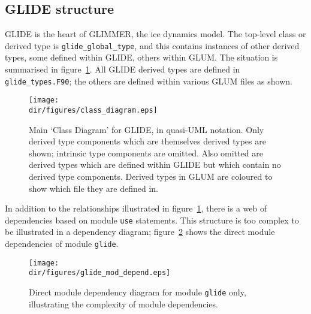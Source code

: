 \subsection{GLIDE structure}
%
GLIDE is the heart of GLIMMER, the ice dynamics model. The top-level class or
derived type is \texttt{glide\_global\_type}, and this contains instances of
other derived types, some defined within GLIDE, others within GLUM. The
situation is summarised in figure~\ref{dg.fig.glide_class_diagram}. All GLIDE
derived types are defined in \texttt{glide\_types.F90}; the others are defined
within various GLUM files as shown.
%
\begin{figure}[htbp]
\centering
\texttt{[image: \\dir/figures/class\_diagram.eps]}
\caption{Main `Class Diagram' for GLIDE, in quasi-UML notation. Only derived type components which
  are themselves derived types are shown; intrinsic type components are
  omitted. Also omitted are derived types which are defined within GLIDE but
  which contain no derived type components. Derived types in GLUM are
  coloured to show which file they are defined in.}
\label{dg.fig.glide_class_diagram}
\end{figure}

In addition to the relationships illustrated in
figure~\ref{dg.fig.glide_class_diagram}, there is a web of dependencies based
on module \texttt{use} statements. This structure is too complex to be
illustrated in a dependency diagram; figure~\ref{dg.fig.glide_mod_depend} shows the direct module
dependencies of module \texttt{glide}.
%
\begin{figure}[htbp]
\centering
\texttt{[image: \\dir/figures/glide\_mod\_depend.eps]}
\caption{Direct module dependency diagram for module \texttt{glide} only,
  illustrating the complexity of module dependencies.}
\label{dg.fig.glide_mod_depend}
\end{figure}

